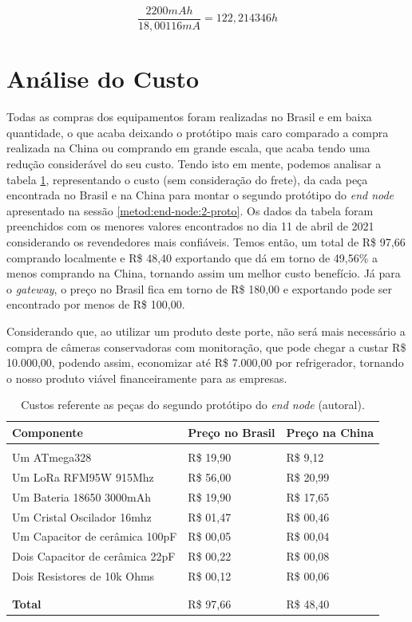 \begin{equation}
  \frac{2200 mAh}{18,00116 mA} = 122,214346 h
  \label{equation:p2-hours} 
\end{equation}

\section{Análise do Custo}
\label{result:custo}
Todas as compras dos equipamentos foram realizadas no Brasil e em baixa quantidade, o que acaba deixando o protótipo mais caro comparado a compra realizada na China ou comprando em grande escala, que acaba tendo uma redução considerável do seu custo. Tendo isto em mente, podemos analisar a tabela \ref{tab:costs-2-proto}, representando o custo (sem consideração do frete), da cada peça encontrada no Brasil e na China para montar o segundo protótipo do \textit{end node} apresentado na sessão \ref{metod:end-node:2-proto}. Os dados da tabela foram preenchidos com os menores valores encontrados no dia 11 de abril de 2021 considerando os revendedores mais confiáveis. Temos então, um total de R\$ 97,66 comprando localmente e R\$ 48,40 exportando que dá em torno de 49,56\% a menos comprando na China, tornando assim um melhor custo benefício.	Já para o \textit{gateway}, o preço no Brasil fica em torno de R\$  180,00 e exportando pode ser encontrado por menos de R\$  100,00.

Considerando que, ao utilizar um produto deste porte, não será mais necessário a compra de câmeras conservadoras com monitoração,  que pode chegar a custar R\$ 10.000,00, podendo assim, economizar até R\$ 7.000,00 por refrigerador, tornando o nosso produto viável financeiramente para as empresas.

\begin{table}[H]
  \centering 
  \scalebox{1} {
    \begin{tabular}{l | l | l}
    \textbf{Componente}&\textbf{Preço no Brasil}&\textbf{Preço na China}\\[5pt] \hline
    &&\\
    Um ATmega328&R\$ 19,90&R\$ 9,12 \\[5pt]
    Um LoRa RFM95W 915Mhz&R\$ 56,00&R\$ 20,99 \\[5pt]
    Um Bateria 18650 3000mAh&R\$ 19,90 &R\$ 17,65 \\[5pt]
    Um Cristal Oscilador 16mhz&R\$ 01,47&R\$ 00,46 \\[5pt]
    Um Capacitor de cerâmica 100pF&R\$ 00,05&R\$ 00,04 \\[5pt]
    Dois Capacitor de cerâmica 22pF&R\$ 00,22&R\$ 00,08 \\[5pt]
    Dois Resistores de 10k Ohms&R\$ 00,12&R\$ 00,06 \\
    &&\\ \hline
    &&\\
    \textbf{Total}&R\$ 97,66&R\$ 48,40 \\[5pt]
    \end{tabular}
  }
  \caption{Custos referente as peças do segundo protótipo do \textit{end node} (autoral).}
  \label{tab:costs-2-proto}
\end{table}
  